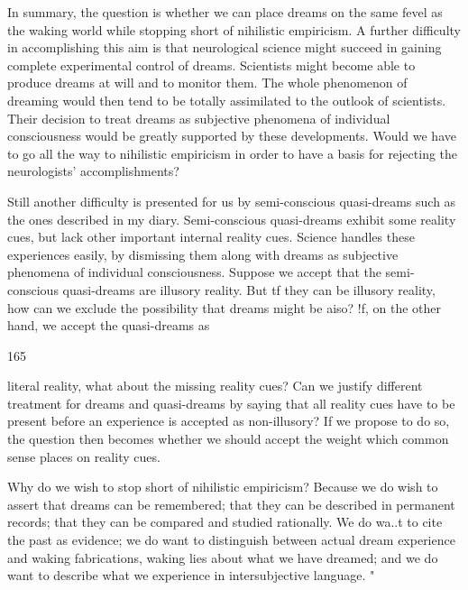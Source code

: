 \documentclass[10pt,twoside]{memoir}
\begin{document}
\begin{enumerate}
{\begin{enumerate}
\begin{sysrules}
\begin{sysrules}
\begin{sysrules}
\begin{sysrules}
{\begin{enumerate}
{{{{{{{In summary, the question is whether we can place dreams on the same 
fevel as the waking world while stopping short of nihilistic empiricism. A 
further difficulty in accomplishing this aim is that neurological science might 
succeed in gaining complete experimental control of dreams. Scientists might 
become able to produce dreams at will and to monitor them. The whole 
phenomenon of dreaming would then tend to be totally assimilated to the 
outlook of scientists. Their decision to treat dreams as subjective phenomena 
of individual consciousness would be greatly supported by these 
developments. Would we have to go all the way to nihilistic empiricism in 
order to have a basis for rejecting the neurologists' accomplishments? 

Still another difficulty is presented for us by semi-conscious 
quasi-dreams such as the ones described in my diary. Semi-conscious 
quasi-dreams exhibit some reality cues, but lack other important internal 
reality cues. Science handles these experiences easily, by dismissing them 
along with dreams as subjective phenomena of individual consciousness. 
Suppose we accept that the semi-conscious quasi-dreams are illusory reality. 
But tf they can be illusory reality, how can we exclude the possibility that 
dreams might be aiso? !f, on the other hand, we accept the quasi-dreams as 


165 


literal reality, what about the missing reality cues? Can we justify different 
treatment for dreams and quasi-dreams by saying that all reality cues have to 
be present before an experience is accepted as non-illusory? If we propose 
to do so, the question then becomes whether we should accept the weight 
which common sense places on reality cues. 


Why do we wish to stop short of nihilistic empiricism? Because we do 
wish to assert that dreams can be remembered; that they can be described in 
permanent records; that they can be compared and studied rationally. We do 
wa..t to cite the past as evidence; we do want to distinguish between actual 
dream experience and waking fabrications, waking lies about what we have 
dreamed; and we do want to describe what we experience in intersubjective 
language. " 

}}}}}}}
\end{enumerate}}
\end{sysrules}
\end{sysrules}
\end{sysrules}
\end{sysrules}
\end{enumerate}}
\end{enumerate}
\end{document}
